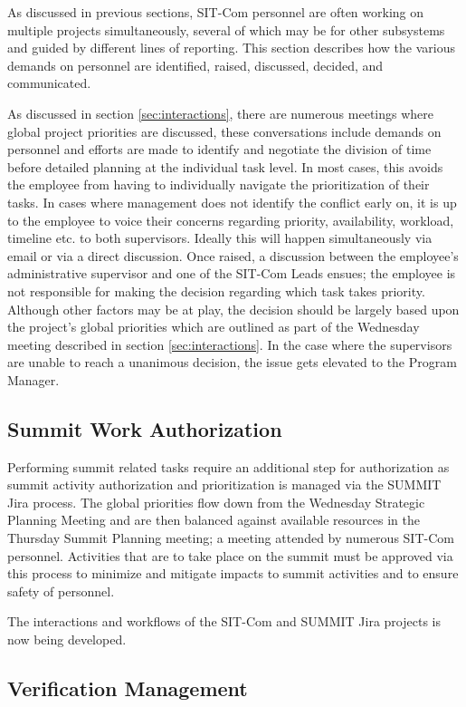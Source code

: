 \documentclass[SE,lsstdraft,authoryear,toc]{lsstdoc, lsstdraft}
\begin{document}
As discussed in previous sections, SIT-Com personnel are often working on multiple projects simultaneously, several of which may be for other subsystems and guided by different lines of reporting.
This section describes how the various demands on personnel are identified, raised, discussed, decided, and communicated.

As discussed in section \ref{sec:interactions}, there are numerous meetings where global project priorities are discussed, these conversations include demands on personnel and efforts are made to identify and negotiate the division of time before detailed planning at the individual task level.
In most cases, this avoids the employee from having to individually navigate the prioritization of their tasks.
In cases where management does not identify the conflict early on, it is up to the employee to voice their concerns regarding priority, availability, workload, timeline etc. to both supervisors.
Ideally this will happen simultaneously via email or via a direct discussion.
Once raised, a discussion between the employee's administrative supervisor and one of the SIT-Com Leads ensues; the employee is not responsible for making the decision regarding which task takes priority.
Although other factors may be at play, the decision should be largely based upon the project's global priorities which are outlined as part of the Wednesday meeting described in section \ref{sec:interactions}.
In the case where the supervisors are unable to reach a unanimous decision, the issue gets elevated to the Program Manager.

\subsection{Summit Work Authorization}
Performing summit related tasks require an additional step for authorization as summit activity authorization and prioritization is managed via the SUMMIT Jira process.
The global priorities flow down from the Wednesday Strategic Planning Meeting and are then balanced against available resources in the Thursday Summit Planning meeting; a meeting attended by numerous SIT-Com personnel.
Activities that are to take place on the summit must be approved via this process to minimize and mitigate impacts to summit activities and to ensure safety of personnel.

The interactions and workflows of the SIT-Com and SUMMIT Jira projects is now being developed.

\subsection{Verification Management}
\end{document}
